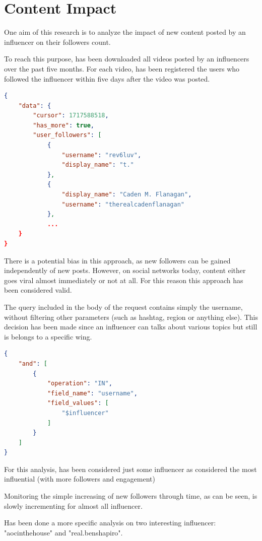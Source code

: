 \section{Content Impact}

One aim of this research is to analyze the impact of new content posted by an influencer on their followers count.

To reach this purpose, has been downloaded all videos posted by an influencers over the past five months. For each video, has been registered the users who followed the influencer within five days after the video was posted.

\begin{lstlisting}[language=json]
{
    "data": {
        "cursor": 1717588518,
        "has_more": true,
        "user_followers": [
            {
                "username": "rev6luv",
                "display_name": "t."
            },
            {
                "display_name": "Caden M. Flanagan",
                "username": "therealcadenflanagan"
            },
            ...
    }
} 
\end{lstlisting}

There is a potential bias in this approach, as new followers can be gained independently of new posts. However, on social networks today, content either goes viral almost immediately or not at all. For this reason this approach has been considered valid.

The query included in the body of the request contains simply the username, without filtering other parameters (such as hashtag, region or anything else). This decision has been made since an influencer can talks about various topics but still is belongs to a specific wing. 

\begin{lstlisting}[language=json]
{
    "and": [
        {
            "operation": "IN",
            "field_name": "username",
            "field_values": [
                "$influencer" 
            ]
        }
    ]
}
\end{lstlisting}

For this analysis, has been considered just some influencer as considered the most influential (with more followers and engagement)

Monitoring the simple increasing of new followers through time, as can be seen, is slowly incrementing for almost all influencer.

Has been done a more specific analysis on two interesting influencer: "aocinthehouse" and "real.benshapiro".

